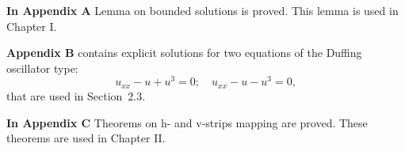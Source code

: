 \documentclass[candidate, href, colorlinks]{disser}
\begin{document}
\textbf{In Appendix A} Lemma on bounded solutions is proved.
This lemma is used in Chapter I.

\textbf{Appendix B} contains explicit solutions for two equations of the Duffing oscillator type: 
\begin{equation}
	u_{xx} - u + u^3 = 0; \quad u_{xx} - u - u^3 = 0,
\end{equation}
that are used in Section~2.3.

\textbf{In Appendix C} Theorems on h- and v-strips mapping are proved.
These theorems are used in Chapter II.


\def\thispagestyle#1{}
\renewcommand{\bibname}{\protect\leftline{\large List of Publications on the Topic of Dissertation}}
\printbibliography[keyword=own]


\end{document}

